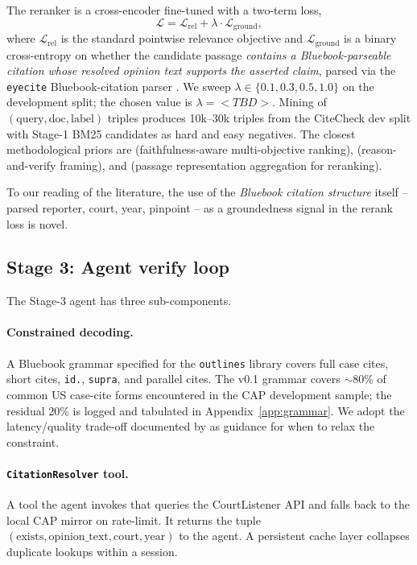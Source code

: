 \documentclass[11pt]{article}
\begin{document}
The reranker is a cross-encoder fine-tuned with a two-term loss,
\begin{equation}
\mathcal{L} = \mathcal{L}_{\text{rel}}
            + \lambda \cdot \mathcal{L}_{\text{ground}},
\label{eq:loss}
\end{equation}
where $\mathcal{L}_{\text{rel}}$ is the standard pointwise relevance
objective and $\mathcal{L}_{\text{ground}}$ is a binary cross-entropy
on whether the candidate passage \emph{contains a Bluebook-parseable
citation whose resolved opinion text supports the asserted claim},
parsed via the \texttt{eyecite} Bluebook-citation parser
\citep{cushman2018eyecite}. We sweep $\lambda \in \{0.1, 0.3, 0.5,
1.0\}$ on the development split; the chosen value is
$\lambda = <TBD>$. Mining of $(\text{query}, \text{doc},
\text{label})$ triples produces 10k--30k triples from the CiteCheck
dev split with Stage-1 BM25 candidates as hard and easy negatives.
The closest methodological priors are
\citet{guan2025faithfulnessaware} (faithfulness-aware multi-objective
ranking), \citet{khan2026reasonverify} (reason-and-verify framing),
and \citet{li2023parade} (passage representation aggregation for
reranking).

To our reading of the literature, the use of the \emph{Bluebook
citation structure} itself -- parsed reporter, court, year, pinpoint
-- as a groundedness signal in the rerank loss is novel.

\subsection{Stage 3: Agent verify loop}
\label{sec:method:agent}

The Stage-3 agent has three sub-components.

\paragraph{Constrained decoding.}
A Bluebook grammar specified for the \texttt{outlines} library
\citep{willard2023outlines} covers full case cites, short cites,
\texttt{id.}, \texttt{supra}, and parallel cites. The v0.1 grammar
covers ${\sim}80\%$ of common US case-cite forms encountered in the
CAP development sample; the residual 20\% is logged and tabulated in
Appendix~\ref{app:grammar}. We adopt the latency/quality trade-off
documented by \citet{schall2025constraineddecoding} as guidance for
when to relax the constraint.

\paragraph{\texttt{CitationResolver} tool.}
A tool the agent invokes that queries the CourtListener API
\citep{courtlistener} and falls back to the local CAP mirror
\citep{cap2018} on rate-limit. It returns the tuple
$(\text{exists}, \text{opinion\_text}, \text{court}, \text{year})$
to the agent. A persistent cache layer collapses duplicate lookups
within a session.
\end{document}
